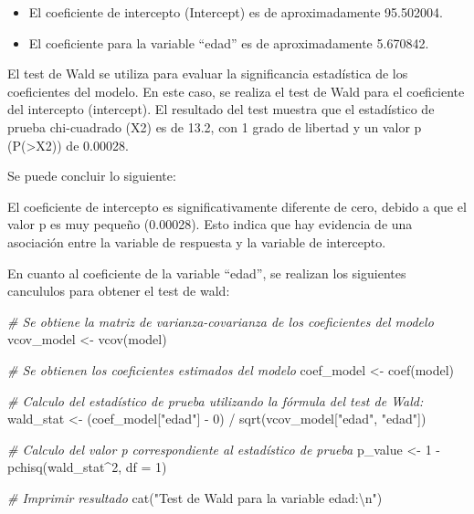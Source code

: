 \documentclass[
]{article}
\newenvironment{Shaded}{\begin{snugshade}}{\end{snugshade}}
\newcommand{\AttributeTok}[1]{\textcolor[rgb]{0.77,0.63,0.00}{#1}}
\newcommand{\CommentTok}[1]{\textcolor[rgb]{0.56,0.35,0.01}{\textit{#1}}}
\newcommand{\DecValTok}[1]{\textcolor[rgb]{0.00,0.00,0.81}{#1}}
\newcommand{\FunctionTok}[1]{\textcolor[rgb]{0.00,0.00,0.00}{#1}}
\newcommand{\NormalTok}[1]{#1}
\newcommand{\OtherTok}[1]{\textcolor[rgb]{0.56,0.35,0.01}{#1}}
\newcommand{\SpecialCharTok}[1]{\textcolor[rgb]{0.00,0.00,0.00}{#1}}
\newcommand{\StringTok}[1]{\textcolor[rgb]{0.31,0.60,0.02}{#1}}
\providecommand{\tightlist}{%
  \setlength{\itemsep}{0pt}\setlength{\parskip}{0pt}}
\begin{document}
\begin{itemize}
\tightlist
\item
  El coeficiente de intercepto (Intercept) es de aproximadamente
  95.502004.
\item
  El coeficiente para la variable ``edad'' es de aproximadamente
  5.670842.
\end{itemize}

El test de Wald se utiliza para evaluar la significancia estadística de
los coeficientes del modelo. En este caso, se realiza el test de Wald
para el coeficiente del intercepto (intercept). El resultado del test
muestra que el estadístico de prueba chi-cuadrado (X2) es de 13.2, con 1
grado de libertad y un valor p (P(\textgreater X2)) de 0.00028.

Se puede concluir lo siguiente:

El coeficiente de intercepto es significativamente diferente de cero,
debido a que el valor p es muy pequeño (0.00028). Esto indica que hay
evidencia de una asociación entre la variable de respuesta y la variable
de intercepto.

En cuanto al coeficiente de la variable ``edad'', se realizan los
siguientes cancululos para obtener el test de wald:

\begin{Shaded}
\begin{Highlighting}[]
\CommentTok{\# Se obtiene la matriz de varianza{-}covarianza de los coeficientes del modelo}
\NormalTok{vcov\_model }\OtherTok{\textless{}{-}} \FunctionTok{vcov}\NormalTok{(model)}

\CommentTok{\# Se obtienen los coeficientes estimados del modelo}
\NormalTok{coef\_model }\OtherTok{\textless{}{-}} \FunctionTok{coef}\NormalTok{(model)}

\CommentTok{\# Calculo del estadístico de prueba utilizando la fórmula del test de Wald:}
\NormalTok{wald\_stat }\OtherTok{\textless{}{-}}\NormalTok{ (coef\_model[}\StringTok{"edad"}\NormalTok{] }\SpecialCharTok{{-}} \DecValTok{0}\NormalTok{) }\SpecialCharTok{/} \FunctionTok{sqrt}\NormalTok{(vcov\_model[}\StringTok{"edad"}\NormalTok{, }\StringTok{"edad"}\NormalTok{])}

\CommentTok{\# Calculo del valor p correspondiente al estadístico de prueba}
\NormalTok{p\_value }\OtherTok{\textless{}{-}} \DecValTok{1} \SpecialCharTok{{-}} \FunctionTok{pchisq}\NormalTok{(wald\_stat}\SpecialCharTok{\^{}}\DecValTok{2}\NormalTok{, }\AttributeTok{df =} \DecValTok{1}\NormalTok{)}

\CommentTok{\# Imprimir resultado}
\FunctionTok{cat}\NormalTok{(}\StringTok{"Test de Wald para la variable \textquotesingle{}edad\textquotesingle{}:}\SpecialCharTok{\textbackslash{}n}\StringTok{"}\NormalTok{)}
\end{Highlighting}
\end{Shaded}
\end{document}
